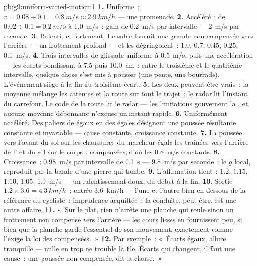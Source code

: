 \begin{solution}{pb:g9:uniform-varied-motion:1}
\textbf{1.} Uniforme~; $v = 0.08 \div 0.1 = \qty{0.8}{m/s} \approx
\qty{2.9}{km/h}$ --- une promenade.
\textbf{2.} Accéléré~: de $0.02 \div 0.1 = \qty{0.2}{m/s}$ à
\qty{1.0}{m/s}~; gain de \qty{0.2}{m/s} par intervalle ---
\qty{2}{m/s} par seconde.
\textbf{3.} Ralenti, et fortement. Le sable fournit une grande 
non compensée vers l'arrière --- un frottement profond --- et les
 dégringolent~: $1.0$, $0.7$, $0.45$, $0.25$,
\qty{0.1}{m/s}.
\textbf{4.} Trois intervalles de glissade uniforme à \qty{0.5}{m/s},
puis une accélération --- les écarts bondissant à $7.5$ puis
\qty{10.0}{cm}~: entre le troisième et le quatrième intervalle,
quelque chose s'est mis à pousser (une pente, une bourrade).
L'événement siège à la fin du troisième écart.
\textbf{5.} Les deux peuvent être vrais~: la moyenne mélange les
attentes et la route sur tout le trajet~; le radar lit l'instant du
carrefour. Le code de la route lit le radar --- les limitations
gouvernent la , et aucune moyenne débonnaire
n'excuse un instant rapide.
\textbf{6.} Uniformément accéléré. Des paliers de  égaux en
des  égales désignent une poussée résultante constante et
invariable --- cause constante, croissance constante.
\textbf{7.} La poussée vers l'avant du sol sur les chaussures du
marcheur égale les traînées vers l'arrière de l' et du sol sur le
corps~: compensées, d'où les \qty{0.8}{m/s} constants.
\textbf{8.} Croissance~: \qty{0.98}{m/s} par intervalle de
\qty{0.1}{s} --- \qty{9.8}{m/s} par seconde~: le $g$ local, reproduit
par la bande d'une pierre qui tombe.
\textbf{9.} L'affirmation tient~:  $1.2$, $1.15$, $1.10$,
$1.05$, \qty{1.0}{m/s} --- un ralentissement doux, du début à la fin.
\textbf{10.} Sortie $1.2 \times 3.6 = \qty{4.3}{km/h}$~; entrée
\qty{3.6}{km/h} --- l'une et l'autre bien en dessous de la référence
du cycliste~: imprudence acquittée~; la conduite, peut-être, est une
autre affaire.
\textbf{11.} «~Sur le plat, rien n'arrête une planche qui roule
sinon un frottement non compensé vers l'arrière --- les cours lisses
en fournissent peu, si bien que la planche garde l'essentiel de son
mouvement, exactement comme l'exige la loi des 
compensées.~»
\textbf{12.} Par exemple~: «~Écarts égaux, allure tranquille --- nulle
 en trop ne trouble la file. Écarts qui changent, il faut une
cause~: une poussée non compensée, dit la clause.~»
\end{solution}
